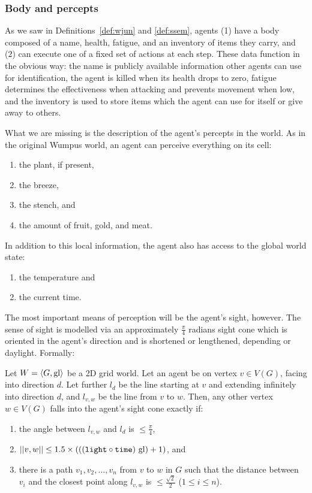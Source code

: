 \subsubsection{Body and percepts}

As we saw in Definitions~\ref{def:wjun} and \ref{def:ssem}, agents (1) have a body composed of a name, health, fatigue, and an inventory of items they carry, and (2) can execute one of a fixed set of actions at each step. These data function in the obvious way: the name is publicly available information other agents can use for identification, the agent is killed when its health drops to zero, fatigue determines the effectiveness when attacking and prevents movement when low, and the inventory is used to store items which the agent can use for itself or give away to others.

What we are missing is the description of the agent's percepts in the world. As in the original Wumpus world, an agent can perceive everything on its cell:
	\begin{enumerate}
		\item the plant, if present,
		\item the breeze,
		\item the stench, and
		\item the amount of fruit, gold, and meat.
	\end{enumerate}
	
In addition to this local information, the agent also has access to the global world state:

	\begin{enumerate}
		\item the temperature and
		\item the current time.
	\end{enumerate}

The most important means of perception will be the agent's sight, however. The sense of sight is modelled via an approximately $\frac{\pi}{4}$ radians sight cone which is oriented in the agent's direction and is shortened or lengthened, depending or daylight. Formally:

\begin{definition}
	\label{def:los}
	Let $W = \langle G, \mathrm{gl} \rangle$ be a 2D grid world. Let an agent be on vertex $v \in V(G)$, facing into direction $d$. Let further $l_d$ be the line starting at $v$ and extending infinitely into direction $d$, and $l_{v,w}$ be the line from $v$ to $w$. Then, any other vertex $w \in V(G)$ falls into the agent's sight cone exactly if:
	
	\begin{enumerate}
		\item the angle between $l_{v,w}$ and $l_d$ is $\leq \frac{\pi}{4}$,
		\item $||{v},{w}|| \leq 1.5 \times (((\mathtt{light} \circ \mathtt{time})\ \mathrm{gl}) + 1)$, and
		\item there is a path $v_1, v_2, \dots, v_n$ from $v$ to $w$ in $G$ such that
		the distance between $v_i$ and the closest point along $l_{v,w}$ is $\leq \frac{\sqrt{2}}{2}$ ($1 \leq i \leq n$).
	\end{enumerate}
\end{definition}

